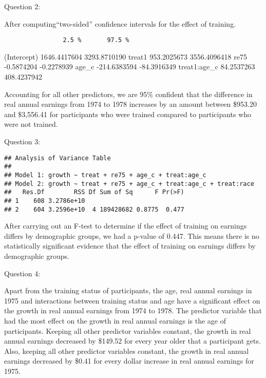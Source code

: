 \documentclass[
]{article}
\begin{document}
Question 2:

After computing``two-sided'' confidence intervals for the effect of
training.

\begin{verbatim}
                2.5 %       97.5 %
\end{verbatim}

(Intercept) 1646.4417604 3293.8710190 treat1 953.2025673 3556.4096418
re75 -0.5874204 -0.2278939 age\_c -214.6383594 -84.3916349 treat1:age\_c
84.2537263 408.4237942

Accounting for all other predictors, we are 95\% confident that the
difference in real annual earnings from 1974 to 1978 increases by an
amount between \$953.20 and \$3,556.41 for participants who were trained
compared to participants who were not trained.

Question 3:

\begin{verbatim}
## Analysis of Variance Table
## 
## Model 1: growth ~ treat + re75 + age_c + treat:age_c
## Model 2: growth ~ treat + re75 + age_c + treat:age_c + treat:race
##   Res.Df        RSS Df Sum of Sq      F Pr(>F)
## 1    608 3.2786e+10                           
## 2    604 3.2596e+10  4 189428682 0.8775  0.477
\end{verbatim}

After carrying out an F-test to determine if the effect of training on
earnings differs by demographic groups, we had a p-value of 0.447. This
means there is no statistically significant evidence that the effect of
training on earnings differs by demographic groups.

Question 4:

Apart from the training status of participants, the age, real annual
earnings in 1975 and interactions between training status and age have a
significant effect on the growth in real annual earnings from 1974 to
1978. The predictor variable that had the most effect on the growth in
real annual earnings is the age of participants. Keeping all other
predictor variables constant, the growth in real annual earnings
decreased by \$149.52 for every year older that a participant gets.
Also, keeping all other predictor variables constant, the growth in real
annual earnings decreased by \$0.41 for every dollar increase in real
annual earnings for 1975.
\end{document}
